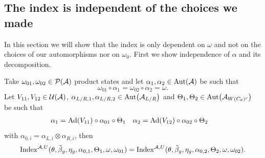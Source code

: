 \documentclass[12pt,a4paper,twoside]{article}
\numberwithin{equation}{section}
\begin{document}
\subsection{The index is independent of the choices we made}\label{sec:IndexIsInvariantUnderChoices}
In this section we will show that the index is only dependent on $\omega$ and not on the choices of our automorphisms nor on $\omega_0$. First we show independence of $\alpha$ and its decomposition.
\begin{lemma}
	Take $\omega_{01},\omega_{02}\in\PP(\AA)$ product states and let $\alpha_1,\alpha_2\in\Aut{\AA}$ be such that
	\begin{equation}
		\omega_{01}\circ\alpha_1=\omega_{02}\circ\alpha_2=\omega.
	\end{equation}
	Let $V_{11},V_{12}\in\UU(\AA)$, $\alpha_{L/R,1},\alpha_{L/R,2}\in\Aut{\AA_{L/R}}$ and $\Theta_1,\Theta_2\in \Aut{\AA_{W(C_\theta)^c}}$ be such that
	\begin{align}
		\alpha_1&=\Ad{V_{11}}\circ\alpha_{01}\circ\Theta_1&\alpha_2&=\Ad{V_{12}}\circ\alpha_{02}\circ \Theta_2
	\end{align}
	with $\alpha_{0,i}=\alpha_{L,i}\otimes\alpha_{R,i}$, then
	\begin{equation}
		\textrm{Index}^{\AA,U}(\theta,\tilde{\beta}_g,\eta_g,\alpha_{0,1},\Theta_1,\omega,\omega_{01})=\textrm{Index}^{\AA,U}(\theta,\tilde{\beta}_g,\eta_g,\alpha_{0,2},\Theta_2,\omega,\omega_{02}).
	\end{equation}
\end{lemma}
\end{document}
